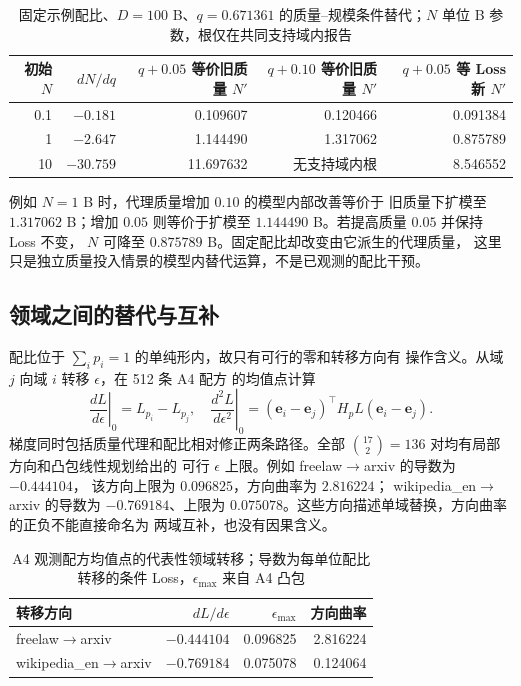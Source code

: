 \begin{table}[htbp]
\centering\small
\caption{固定示例配比、$D=100$ B、$q=0.671361$ 的质量--规模条件替代；$N$ 单位 B 参数，根仅在共同支持域内报告}
\label{tab:cyj-q2-tradeoff}
\begin{tabular}{rrrrr}
\hline
初始 $N$ & $dN/dq$ & $q+0.05$ 等价旧质量 $N'$ & $q+0.10$ 等价旧质量 $N'$ & $q+0.05$ 等 Loss 新 $N'$\\ \hline
0.1 & $-0.181$ & 0.109607 & 0.120466 & 0.091384\\
1 & $-2.647$ & 1.144490 & 1.317062 & 0.875789\\
10 & $-30.759$ & 11.697632 & 无支持域内根 & 8.546552\\ \hline
\end{tabular}
\end{table}

例如 $N=1$ B 时，代理质量增加 $0.10$ 的模型内部改善等价于
旧质量下扩模至 $1.317062$ B；增加 $0.05$ 则等价于扩模至
$1.144490$ B。若提高质量 $0.05$ 并保持 Loss 不变，
$N$ 可降至 $0.875789$ B。固定配比却改变由它派生的代理质量，
这里只是独立质量投入情景的模型内替代运算，不是已观测的配比干预。

\subsection{领域之间的替代与互补}

配比位于 $\sum_i p_i=1$ 的单纯形内，故只有可行的零和转移方向有
操作含义。从域 $j$ 向域 $i$ 转移 $\epsilon$，在 512 条 A4 配方
的均值点计算
\begin{equation}\label{eq:cyj-pair}
\left.\frac{dL}{d\epsilon}\right|_0=L_{p_i}-L_{p_j},\quad
\left.\frac{d^2L}{d\epsilon^2}\right|_0=
(\boldsymbol e_i-\boldsymbol e_j)^\top H_pL
(\boldsymbol e_i-\boldsymbol e_j).
\end{equation}
梯度同时包括质量代理和配比相对修正两条路径。全部
$\binom{17}{2}=136$ 对均有局部方向和凸包线性规划给出的
可行 $\epsilon$ 上限。例如 freelaw$\to$arxiv 的导数为 $-0.444104$，
该方向上限为 $0.096825$，方向曲率为 $2.816224$；
wikipedia\_en$\to$arxiv 的导数为 $-0.769184$、上限为
$0.075078$。这些方向描述单域替换，方向曲率的正负不能直接命名为
两域互补，也没有因果含义。

\begin{table}[htbp]
\centering\small
\caption{A4 观测配方均值点的代表性领域转移；导数为每单位配比转移的条件 Loss，$\epsilon_{\max}$ 来自 A4 凸包}
\label{tab:cyj-q2-pairs}
\begin{tabular}{lrrr}
\hline
转移方向 & $dL/d\epsilon$ & $\epsilon_{\max}$ & 方向曲率\\ \hline
freelaw$\to$arxiv & $-0.444104$ & 0.096825 & 2.816224\\
wikipedia\_en$\to$arxiv & $-0.769184$ & 0.075078 & 0.124064\\ \hline
\end{tabular}
\end{table}

